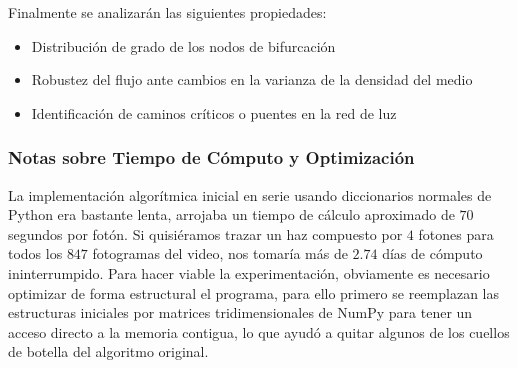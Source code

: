 Finalmente se analizarán las siguientes propiedades:
\begin{itemize}
    \item Distribución de grado de los nodos de bifurcación
    \item Robustez del flujo ante cambios en la varianza de la densidad del medio
    \item Identificación de caminos críticos o puentes en la red de luz
\end{itemize}

\subsubsection{Notas sobre Tiempo de Cómputo y Optimización}
La implementación algorítmica inicial en serie usando diccionarios normales de Python era bastante lenta, arrojaba un tiempo de cálculo aproximado de $70$ segundos por fotón. Si quisiéramos trazar un haz compuesto por $4$ fotones para todos los $847$ fotogramas del video, nos tomaría más de $2.74$ días de cómputo ininterrumpido. Para hacer viable la experimentación, obviamente es necesario optimizar de forma estructural el programa, para ello primero se reemplazan las estructuras iniciales por matrices tridimensionales de NumPy para tener un acceso directo a la memoria contigua, lo que ayudó a quitar algunos de los cuellos de botella del algoritmo original.

